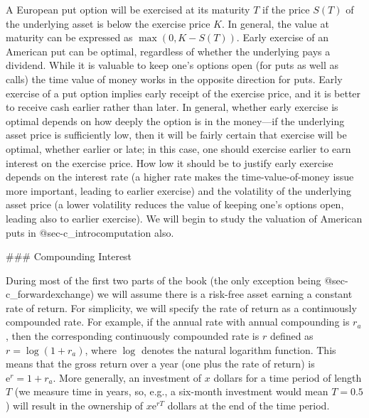 A European put option will be exercised at its maturity $T$ if the price $S(T)$ of the underlying asset is below the exercise price $K$.  In general, the value at maturity can be expressed as $\max(0,K-S(T))$.  Early exercise of an American put can be optimal, regardless of whether the underlying pays a dividend.  While it is valuable to keep one's options open (for puts as well as calls) the time value of money works in the opposite direction for puts.  Early exercise of a put option implies early receipt of the exercise price, and it is better to receive cash earlier rather than later. In general, whether early exercise is optimal depends on how deeply the option is in the money---if the underlying asset price is sufficiently low, then it will be fairly certain that exercise will be optimal, whether earlier or late; in this case, one should exercise earlier to earn interest on the exercise price.  How low it should be to justify early exercise depends on the interest rate (a higher rate makes the time-value-of-money issue more important, leading to earlier exercise) and the volatility of the underlying asset price (a lower volatility reduces the value of keeping one's options open, leading also to earlier exercise).  We will begin to study the valuation of American puts in @sec-c_introcomputation also.

### Compounding Interest

During most of the first two parts of the book (the only exception being @sec-c_forwardexchange) we will assume there is a risk-free asset earning a constant rate of return.   For simplicity, we will specify the rate of return as a continuously compounded rate.   For example, if the annual rate with annual compounding is $r_a$, then the corresponding continuously compounded rate is $r$ defined as $r = \log (1+r_a)$, where $\log$ denotes the natural logarithm function.  This means that the gross return over a year (one plus the rate of return) is $\mathrm{e}^r = 1+r_a$.  More generally, an investment of $x$ dollars for a time period of length $T$ (we measure time in years, so, e.g., a six-month investment would mean $T=0.5$) will result in the ownership of $x\mathrm{e}^{rT}$ dollars at the end of the time period.  


